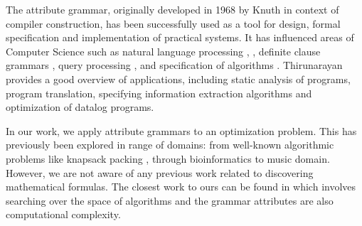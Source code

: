 The attribute grammar, originally developed in 1968 by Knuth \cite{knuth1968semantics} in context of compiler
construction, has been successfully used as a tool for design, formal specification
and implementation of practical systems. It has influenced areas of
Computer Science such as natural language processing \cite{hafiz2011modular}, \cite{starkie2002inferring}, 
definite clause grammars \cite{bratko2001prolog}, query processing \cite{koch2007attribute}, \cite{ramakrishnan1991top} and specification of algorithms \cite{bellanova1984examples}.
Thirunarayan \cite{thirunarayan2009attribute} provides a good overview of 
applications, including static analysis of programs, program translation, specifying information
extraction algorithms and optimization of datalog programs.

In our work, we apply attribute grammars to an optimization problem. This has previously been explored in range of domains: from well-known algorithmic problems 
like knapsack packing \cite{o2004solving}, through bioinformatics \cite{waldispuhl2002approximate} to music domain\cite{desainte1994using}.
However, we are not aware of any previous work related to discovering mathematical formulas. The closest work to ours can be found in \cite{cheung1999attribute} which involves searching
over the space of algorithms and the grammar attributes are also computational complexity.



